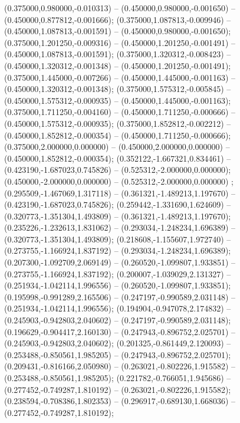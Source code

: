  (0.375000,0.980000,-0.010313) -- (0.450000,0.980000,-0.001650) -- (0.450000,0.877812,-0.001666);
 (0.375000,1.087813,-0.009946) -- (0.450000,1.087813,-0.001591) -- (0.450000,0.980000,-0.001650);
 (0.375000,1.201250,-0.009316) -- (0.450000,1.201250,-0.001491) -- (0.450000,1.087813,-0.001591);
 (0.375000,1.320312,-0.008423) -- (0.450000,1.320312,-0.001348) -- (0.450000,1.201250,-0.001491);
 (0.375000,1.445000,-0.007266) -- (0.450000,1.445000,-0.001163) -- (0.450000,1.320312,-0.001348);
 (0.375000,1.575312,-0.005845) -- (0.450000,1.575312,-0.000935) -- (0.450000,1.445000,-0.001163);
 (0.375000,1.711250,-0.004160) -- (0.450000,1.711250,-0.000666) -- (0.450000,1.575312,-0.000935);
 (0.375000,1.852812,-0.002212) -- (0.450000,1.852812,-0.000354) -- (0.450000,1.711250,-0.000666);
 (0.375000,2.000000,0.000000) -- (0.450000,2.000000,0.000000) -- (0.450000,1.852812,-0.000354);
 (0.352122,-1.667321,0.834461) -- (0.423190,-1.687023,0.745826) -- (0.525312,-2.000000,0.000000);
 (0.450000,-2.000000,0.000000) -- (0.525312,-2.000000,0.000000) ;
 (0.295509,-1.467069,1.317118) -- (0.361321,-1.489213,1.197670) -- (0.423190,-1.687023,0.745826);
 (0.259442,-1.331690,1.624609) -- (0.320773,-1.351304,1.493809) -- (0.361321,-1.489213,1.197670);
 (0.235226,-1.232613,1.831062) -- (0.293034,-1.248234,1.696389) -- (0.320773,-1.351304,1.493809);
 (0.218608,-1.155607,1.972740) -- (0.273755,-1.166924,1.837192) -- (0.293034,-1.248234,1.696389);
 (0.207300,-1.092709,2.069149) -- (0.260520,-1.099807,1.933851) -- (0.273755,-1.166924,1.837192);
 (0.200007,-1.039029,2.131327) -- (0.251934,-1.042114,1.996556) -- (0.260520,-1.099807,1.933851);
 (0.195998,-0.991289,2.165506) -- (0.247197,-0.990589,2.031148) -- (0.251934,-1.042114,1.996556);
 (0.194904,-0.947078,2.174832) -- (0.245903,-0.942803,2.040602) -- (0.247197,-0.990589,2.031148);
 (0.196629,-0.904417,2.160130) -- (0.247943,-0.896752,2.025701) -- (0.245903,-0.942803,2.040602);
 (0.201325,-0.861449,2.120093) -- (0.253488,-0.850561,1.985205) -- (0.247943,-0.896752,2.025701);
 (0.209431,-0.816166,2.050980) -- (0.263021,-0.802226,1.915582) -- (0.253488,-0.850561,1.985205);
 (0.221782,-0.766051,1.945686) -- (0.277452,-0.749287,1.810192) -- (0.263021,-0.802226,1.915582);
 (0.238594,-0.708386,1.802353) -- (0.296917,-0.689130,1.668036) -- (0.277452,-0.749287,1.810192);

